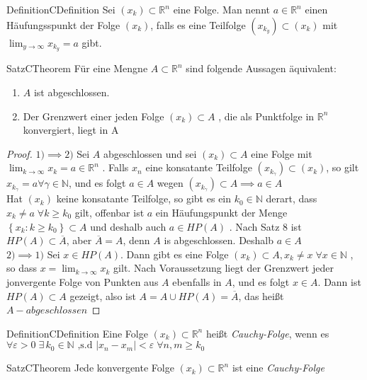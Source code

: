 \documentclass[11.5 pt, a4paper]{memoir}
\begin{document}
\begin{ibox}{Definition}{CDefinition}
     Sei $ \left( x_k \right) \subset \mathbb{R}^n $ eine Folge. Man nennt $ a \in \mathbb{R}^n $ einen Häufungsspunkt der Folge
	 $ \left( x_{k} \right)  $, falls es eine Teilfolge $ \left( x_{k_{y}} \right) \subset \left( x_{k} \right)  $ mit 
	 $ \lim_{y \to \infty }x_{k_{y}} = a  $ gibt.
\end{ibox}
\begin{ibox}[10]{Satz}{CTheorem}
    Für eine Mengne $ A \subset \mathbb{R}^n $ sind folgende Aussagen äquivalent:
	\begin{enumerate}[label=\alph*)]
		\item $ A $ ist abgeschlossen.	
		\item Der Grenzwert einer jeden Folge $ \left( x_{k} \right) \subset A $ , die als Punktfolge in $ \mathbb{R}^n $ konvergiert,
			liegt in A
	\end{enumerate}
\end{ibox}
\begin{proof}
	$ 1) \implies 2) $ Sei $ A $ abgeschlossen und sei $  \left( x_{k} \right) \subset A $ eine Folge mit $ \lim_{k \to \infty } x_k =
	a \in \mathbb{R}^n	$ . Falls $  x_n $ eine konsatante Teilfolge $\left(  x_{k_{ \gamma} } \right) \subset \left( x_k \right)  $,
	so gilt $ x_{k_{ \gamma}} = a \forall \gamma \in \mathbb{N} $, und es folgt $ a \in A $ wegen $ \left( x_{k_{ \gamma}} \right) 
	\subset A  \implies a \in A $ \\
	Hat $ \left( x_k \right) $ keine konsatante Teilfolge, so gibt es ein $ k_0 \in \mathbb{N} $ derart, dass $ x_k \neq a \; \forall
	k \geq k_0$ gilt, offenbar ist $ a $  ein Häufungspunkt der Menge $ \left\{ x_{k}: k \geq k_0 \right\} \subset A $ und deshalb auch
	$ a \in HP(A) $ . Nach Satz 8 ist $ HP(A) \subset \overline{A} $, aber $ \overline{A} = A  $, denn $ A  $ is abgeschlossen. 
	Deshalb $ a \in A $ \\
	$ 2) \implies 1) $ Sei $ x \in HP(A) $. Dann gibt es eine Folge $ \left( x_k \right) \subset A, x_k \neq x \; \forall x \in \mathbb{N} $
	, so dass $ x = \lim_{k \to \infty}x_k $ gilt. Nach Voraussetzung liegt der Grenzwert jeder jonvergente Folge von Punkten aus $ A $ 
	ebenfalls in $ A $, und es folgt $ x \in A $. Dann ist $ HP(A) \subset A $ gezeigt, also ist $ A = A \cup HP(A) = \overline{A} $,
	das heißt $ A-abgeschlossen $ 
\end{proof}

\begin{ibox}{Definition}{CDefinition}
    Eine Folge $ \left( x_k \right)\subset\mathbb{R}^n$ heißt \textit{Cauchy-Folge}, wenn es $ \forall\varepsilon>0 \; \exists\, k_0 
	\in \mathbb{N} \text{ ,s.d } \left|x_n - x_m \right| < \varepsilon \;\forall n,m \geq k_0$ 
\end{ibox}
\begin{ibox}[11]{Satz}{CTheorem}
    Jede konvergente Folge $\left(  x_k  \right) \subset \mathbb{R}^n$ ist eine \textit{Cauchy-Folge}
\end{ibox}
\end{document}
